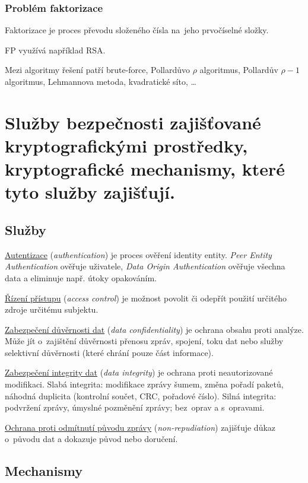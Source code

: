 \subsubsection{Problém faktorizace}

Faktorizace je proces převodu složeného čísla na~jeho prvočíselné složky.

FP využívá například RSA.

Mezi algoritmy řešení patří brute-force, Pollardůvo $\rho$ algoritmus, Pollardův $\rho - 1$ algoritmus, Lehmannova metoda, kvadratické síto, \dots


\clearpage
\section{Služby bezpečnosti zajišťované kryptografickými prostředky, kryptografické mechanismy, které tyto služby zajišťují.}

\subsection{Služby}

\uline{Autentizace} (\emph{authentication}) je proces ověření identity entity.
\emph{Peer Entity Authentication} ověřuje uživatele,
\emph{Data Origin Authentication} ověřuje všechna data a eliminuje např. útoky opakováním.

\uline{Řízení přístupu} (\emph{access control}) je možnost povolit či odepřít použití určitého zdroje určitému subjektu.

\uline{Zabezpečení důvěrnosti dat} (\emph{data confidentiality}) je ochrana obsahu proti analýze.
Může jít o~zajištění důvěrnosti přenosu zpráv, spojení, toku dat nebo služby selektivní důvěrnosti (které chrání pouze část informace).

\uline{Zabezpečení integrity dat} (\emph{data integrity}) je ochrana proti neautorizované modifikaci.
Slabá integrita: modifikace zprávy šumem, změna pořadí paketů, náhodná duplicita (kontrolní součet, CRC, pořadové číslo).
Silná integrita: podvržení zprávy, úmyslné pozměnění zprávy; bez~oprav a s~opravami.

\uline{Ochrana proti odmítnutí původu zprávy} (\emph{non-repudiation}) zajišťuje důkaz o~původu dat a dokazuje původ nebo doručení.

\subsection{Mechanismy}

